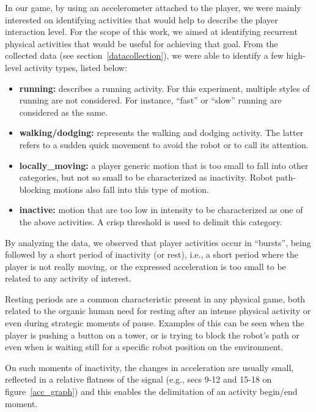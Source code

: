 In our game, by using an accelerometer attached to the player, we were mainly interested on identifying activities that would help to describe the player interaction level. For the scope of this work, we aimed at identifying recurrent physical activities that would be useful for achieving that goal. From the collected data (see section~\ref{datacollection}), we were able to identify a few high-level activity types, listed below:

\begin{itemize}
\item  \textbf{running:} describes a running activity. For this experiment, multiple styles of running are not considered. For instance, ``fast'' or ``slow'' running are considered as the same.
\item \textbf{walking/dodging:} represents the walking and dodging activity. The latter refers to a sudden quick movement to avoid the robot or to call its attention.
\item  \textbf{locally\_moving:} a player generic motion that is too small to fall into other categories, but not so small to be characterized as inactivity. Robot path-blocking motions also fall into this type of motion.
\item  \textbf{inactive:} motion that are too low in intensity to be characterized as one of the above activities. A crisp threshold is used to delimit this category. 
\end{itemize}

By analyzing the data, we observed that player activities occur in ``bursts'', being followed by a short period of inactivity (or rest), i.e., a short period where the player is not really moving, or the expressed acceleration is too small to be related to any activity of interest.

Resting periods are a common characteristic present in any physical game, both related to the organic human need for resting after an intense physical activity or even during strategic moments of pause. Examples of this can be seen when the player is pushing a button on a tower, or is trying to block the robot's path or even when is waiting still for a specific robot position on the environment.

On such moments of inactivity, the changes in acceleration are usually small, reflected in a relative flatness of the signal (e.g., secs 9-12 and 15-18 on figure~\ref{acc_graph}) and this enables the delimitation of an activity begin/end moment.

